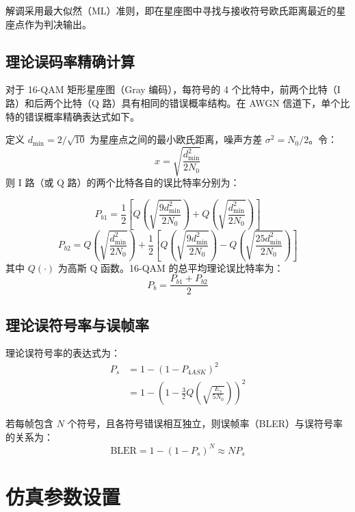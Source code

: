 \documentclass[UTF8]{ctexart}
\begin{document}
解调采用最大似然（ML）准则，即在星座图中寻找与接收符号欧氏距离最近的星座点作为判决输出。

\subsection{理论误码率精确计算}
对于 16-QAM 矩形星座图（Gray 编码），每符号的 4 个比特中，前两个比特（I 路）和后两个比特（Q 路）具有相同的错误概率结构。在 AWGN 信道下，单个比特的错误概率精确表达式如下。

定义 \(d_{\min} = 2/\sqrt{10}\) 为星座点之间的最小欧氏距离，噪声方差 \(\sigma^2 = N_0/2\)。令：
\begin{equation}
    x = \sqrt{\frac{d_{\min}^2}{2N_0}}
\end{equation}
则 I 路（或 Q 路）的两个比特各自的误比特率分别为：

\begin{equation}
    P_{b1} = \frac{1}{2}\left[ Q\left(\sqrt{\frac{9d_{\min}^2}{2N_0}}\right) + Q\left(\sqrt{\frac{d_{\min}^2}{2N_0}}\right) \right]
    \label{eq:Pb1}
\end{equation}
\begin{equation}
    P_{b2} = Q\left(\sqrt{\frac{d_{\min}^2}{2N_0}}\right) + \frac{1}{2}\left[ Q\left(\sqrt{\frac{9d_{\min}^2}{2N_0}}\right) - Q\left(\sqrt{\frac{25d_{\min}^2}{2N_0}}\right) \right]
    \label{eq:Pb2}
\end{equation}
其中 \(Q(\cdot)\) 为高斯 Q 函数。16-QAM 的总平均理论误比特率为：
\begin{equation}
    P_b = \frac{P_{b1} + P_{b2}}{2}
    \label{eq:BER_theory}
\end{equation}

\subsection{理论误符号率与误帧率}
理论误符号率的表达式为：
\begin{align}
    P_s &=1-(1-P_{4ASK})^2\\
    &= 1 - \left(1 - \frac{3}{2} Q\left(\sqrt{\frac{E_s}{5N_0}}\right)\right)^2
    \label{eq:SER_theory}
\end{align}

若每帧包含 \(N\) 个符号，且各符号错误相互独立，则误帧率（BLER）与误符号率的关系为：
\begin{equation}
    \text{BLER} = 1 - (1 - P_s)^N\approx NP_s
    \label{eq:BLER_theory}
\end{equation}

\section{仿真参数设置}
\end{document}
